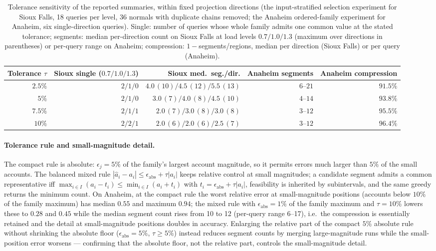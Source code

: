 \begin{table}[pos=htbp]\centering\footnotesize
\caption{Tolerance sensitivity of the reported summaries, within
fixed projection directions (the input-stratified selection experiment for Sioux Falls, 18 queries
per level, 36 normals with duplicate chains removed; the Anaheim ordered-family experiment for
Anaheim, six single-direction queries). Single: number of queries whose
whole family admits one common value at the stated tolerance;
segments: median per-direction count on Sioux Falls at load levels
$0.7/1.0/1.3$ (maximum over directions in parentheses) or per-query
range on Anaheim; compression: $1-$segments/regions, median per
direction (Sioux Falls) or per query (Anaheim).}\label{tab:tolerance}
\begin{tabular}{rrrrr}\toprule
Tolerance $\tau$ & Sioux single ($0.7/1.0/1.3$) & Sioux med.\ seg./dir. & Anaheim segments & Anaheim compression\\\midrule
$2.5\%$ & $2/1/0$ & $4.0\,(10)/4.5\,(12)/5.5\,(13)$ & $6$--$21$ & $91.5\%$\\
$5\%$ & $2/1/0$ & $3.0\,(7)/4.0\,(8)/4.5\,(10)$ & $4$--$14$ & $93.8\%$\\
$7.5\%$ & $2/1/1$ & $2.0\,(7)/3.0\,(8)/3.0\,(8)$ & $3$--$12$ & $95.5\%$\\
$10\%$ & $2/2/1$ & $2.0\,(6)/2.0\,(6)/2.5\,(7)$ & $3$--$12$ & $96.4\%$\\
\bottomrule\end{tabular}\end{table}

\paragraph{Tolerance rule and small-magnitude detail.}\label{supp:tolerance}
The compact rule is absolute: $\epsilon_j=5\%$ of the family's largest
account magnitude, so it permits errors much larger than $5\%$ of the
small accounts. The balanced mixed rule
$|\hat a_i-a_i|\le\epsilon_{\mathrm{abs}}+\tau|a_i|$ keeps relative
control at small magnitudes; a candidate segment admits a common
representative iff $\max_{i\in I}(a_i-t_i)\le\min_{i\in I}(a_i+t_i)$
with $t_i=\epsilon_{\mathrm{abs}}+\tau|a_i|$, feasibility is inherited
by subintervals, and the same greedy returns the minimum count. On
Anaheim, at the compact rule the worst relative error at
small-magnitude positions (accounts below $10\%$ of the family
maximum) has median $0.55$ and maximum $0.94$; the mixed rule with
$\epsilon_{\mathrm{abs}}=1\%$ of the family maximum and $\tau=10\%$
lowers these to $0.28$ and $0.45$ while the median segment count rises
from 10 to 12 (per-query range 6--17), i.e.\ the compression is
essentially retained and the detail at small-magnitude positions
doubles in accuracy. Enlarging the relative part of the compact
$5\%$ absolute rule without shrinking the absolute floor
($\epsilon_{\mathrm{abs}}=5\%$, $\tau\ge5\%$) instead reduces
segment counts by merging large-magnitude runs while the
small-position error worsens --- confirming that the absolute floor,
not the relative part, controls the small-magnitude detail.

